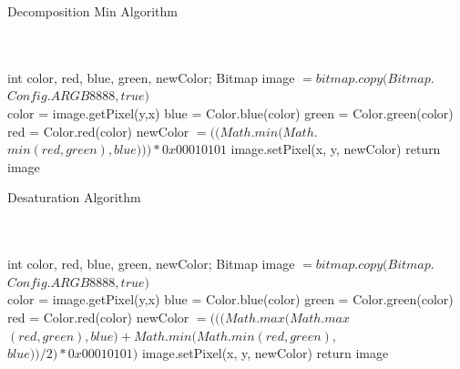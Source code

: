 \documentclass[conference]{IEEEtran}
\begin{document}
\begin{algorithm}
   \caption{Decomposition Min Algorithm}
    \begin{algorithmic}[1]
      \\
		\\
        \State int color, red, blue, green, newColor;
        \State  Bitmap image $= bitmap.copy(Bitmap.$
        \State $Config.ARGB8888, true)$
\\
            		\State color = image.getPixel(y,x)
            		\State blue = Color.blue(color)
            		\State green = Color.green(color)
            		\State red = Color.red(color)
            		\State newColor $= ((Math.min(Math.$
            		\State $min(red, green), blue)))*0x00010101$
                \State image.setPixel(x, y, newColor)
        		\EndFor
        \EndFor
        \State return image
       \EndFunction

\end{algorithmic}
\end{algorithm}
\begin{algorithm}
   \caption{Desaturation Algorithm}
    \begin{algorithmic}[1]
      \\
		\\
        \State int color, red, blue, green, newColor;
        \State  Bitmap image $= bitmap.copy(Bitmap.$
        \State $Config.ARGB8888, true)$
\\
            		\State color = image.getPixel(y,x)
            		\State blue = Color.blue(color)
            		\State green = Color.green(color)
            		\State red = Color.red(color)
            		\State newColor $= (((Math.max(Math.max$
            		\State$(red, green), blue) + Math.min(Math.min(red, green),$
                    \State $blue))/2) *0x00010101)$
                \State image.setPixel(x, y, newColor)
        		\EndFor
        \EndFor
        \State return image
       \EndFunction

\end{algorithmic}
\end{algorithm}
\end{document}
